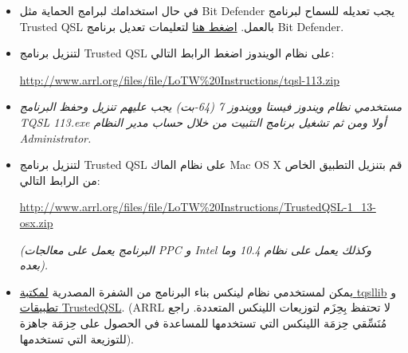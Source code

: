 \documentclass[a4paper,12pt]{article}
\begin{document}
\begin{itemize}
	\item
			في حال استخدامك لبرامج الحماية مثل \textenglish{Bit Defender} يجب تعديله للسماح
			لبرنامج \textenglish{Trusted QSL} بالعمل. {\href{http://www.arrl.org/files/file/LoTW\%20Instructions/How\%20To\%20Configure\%20Bit\%20Defender\%20To\%20Allow\%20Trusted\%20QSL.pdf}{اضغط
		 هنا} لتعليمات تعديل برنامج \textenglish{Bit Defender}}.
	\item
			لتنزيل برنامج \textenglish{Trusted QSL} على نظام الويندوز اضغط الرابط التالي: \par{\href{http://www.arrl.org/files/file/LoTW\%20Instructions/tqsl-113.zip}{http://www.arrl.org/files/file/LoTW\%20Instructions/tqsl-113.zip}}

	\item
			\emph{مستخدمي نظام ويندوز فيستا وويندوز 7 (64-بت) يجب عليهم تنزيل وحفظ
			البرنامج \textenglish{TQSL 113.exe} أولا ومن ثم تشغيل برنامج التثبيت من خلال حساب مدير
			النظام \textenglish{Administrator}.}
	\item
			لتنزيل برنامج \textenglish{Trusted QSL} على نظام الماك \textenglish{Mac OS X} قم بتنزيل التطبيق الخاص من الرابط التالي: \par{\href{http://www.arrl.org/files/file/LoTW\%20Instructions/TrustedQSL-1\_13-osx.zip}{http://www.arrl.org/files/file/LoTW\%20Instructions/TrustedQSL-1\_13-osx.zip}}\par
			\emph{(البرنامج يعمل على معالجات \textenglish{PPC} و \textenglish{Intel} وكذلك يعمل على نظام \textenglish{10.4}
			وما بعده).}
	\item
			يمكن لمستخدمي نظام لينكس بناء البرنامج من الشفرة المصدرية
			{\href{http://www.arrl.org/files/file/LoTW\%20Instructions/tqsllib-2_2_tar.gz}{لمكتبة
			\textenglish{tqsllib}}} و
			{\href{http://www.arrl.org/files/file/LoTW\%20Instructions/TrustedQSL-1_13_tar.gz}{تطبيقات
			\textenglish{TrustedQSL}}}. (\textenglish{ARRL} لا تحتفظ بِحِزَم لتوزيعات اللينكس المتعددة. راجع مُنَسِّقي
			حِزمَة اللينكس التي تستخدمها للمساعدة في الحصول على حِزمَة جاهزة للتوزيعة
			التي تستخدمها).
\end{itemize}

\begin{center}
	\color{slategray2}
{\Huge \decoone}
\end{center}

\clearpage

\end{document}
